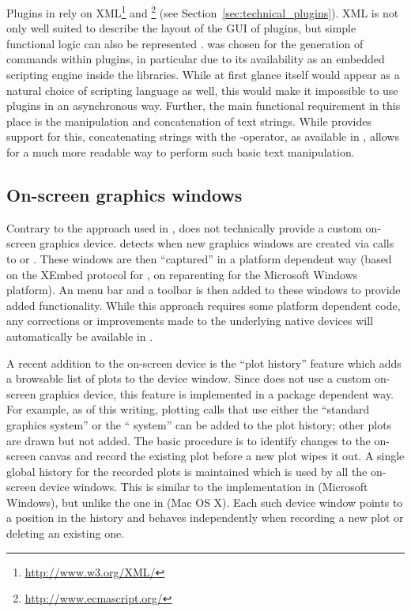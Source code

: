 Plugins in  rely on XML\footnote{\url{http://www.w3.org/XML/}}
and \footnote{\url{http://www.ecmascript.org/}} (see Section~\ref{sec:technical_plugins}). XML is not
only well suited to describe the layout of the GUI of plugins, but simple
functional logic can also be represented \citep[see also][]{Visne2009}.  was
chosen for the generation of  commands within plugins, in particular due to its
availability as an embedded scripting engine inside the  libraries. While at
first glance  itself would appear as a natural choice of scripting language as
well, this would make it impossible to use plugins in an asynchronous way.
Further, the main functional requirement in this place is the manipulation and
concatenation of text strings. While  provides support for this, concatenating
strings with the \code{+}-operator, as available in , allows for a much
more readable way to perform such basic text manipulation.

\subsection{On-screen graphics windows}
\label{sec:technical_graphics}
Contrary to the approach used in  \citep{JGR2010},  does
not technically provide a custom on-screen graphics device.  detects when
new graphics windows are created via calls to  or . These windows
are then ``captured'' in a platform dependent way (based on the XEmbed \citep{Ettrich2002} protocol
for , on reparenting for the Microsoft Windows platform). An  menu bar and a
toolbar is then added to these windows to provide added functionality. While
this approach requires some platform dependent code, any corrections or
improvements made to the underlying  native devices will automatically be
available in .

A recent addition to the on-screen device is the ``plot history'' feature which
adds a browsable list of plots to the device window. Since  does not use a
custom on-screen graphics device, this feature is implemented in a package
dependent way. For example, as of this writing, plotting calls that use either
the ``standard graphics system'' or the `` system'' can be added to the plot
history; other plots are drawn but not added. The basic procedure is to identify
changes to the on-screen canvas and record the existing plot before a new plot
wipes it out. A single global history for the recorded plots is maintained
which is used by all the on-screen device windows. This is similar to the
implementation in  (Microsoft Windows), but unlike the one in  
(Mac OS X). Each such device window points to a position in the history
and behaves independently when recording a new plot or deleting an existing
one.

